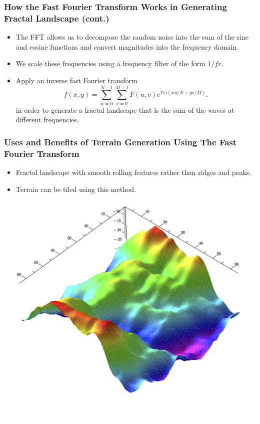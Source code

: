 \documentclass{beamer}
\begin{document}
\begin{frame}
\frametitle{How the Fast Fourier Transform Works in Generating Fractal Landscape (cont.)}
\begin{itemize}
\item The FFT allows us to decompose the random noise into the sum of the sine and cosine functions and convert magnitudes into the frequency domain. 
\item We scale these frequencies using a frequency filter of the form $1/fr$.
\item Apply an inverse fast Fourier transform
$$f(x,y)=\displaystyle\sum\limits_{u=0}^{N-1} \displaystyle\sum\limits_{v=0}^{M-1} F(u,v)e^{2\pi i(xu/N+yv/M)}.$$ 
in order to generate a fractal landscape that is the sum of the waves at different frequencies. 
\end{itemize}
\end{frame}

\begin{frame}
\frametitle{Uses and Benefits of Terrain Generation Using The Fast Fourier Transform}
\begin{itemize}
\item Fractal landscape with smooth rolling features rather than ridges and peaks.
\item Terrain can be tiled using this method.
\end{itemize}
\begin{center}
\includegraphics[scale=0.3]{FourierLandscape.jpg}
\end{center}
\end{frame}
\end{document}
